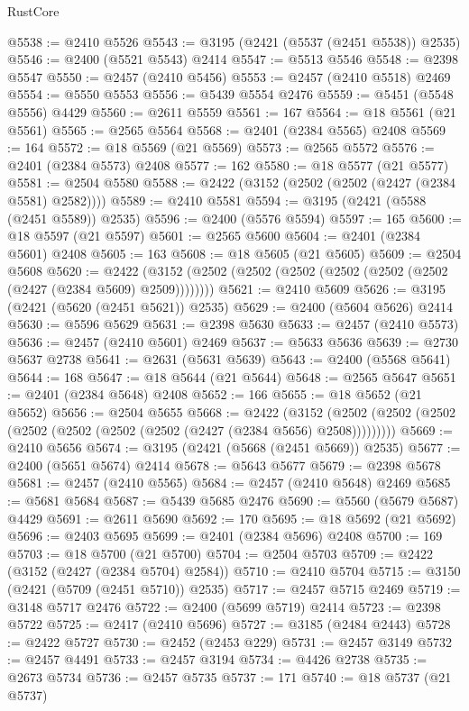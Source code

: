 \begin{lexlean}{RustCore}
\begin{coremodule}
@5538 := @2410 @5526
@5543 := @3195 (@2421 (@5537 (@2451 @5538)) @2535)
@5546 := @2400 (@5521 @5543) @2414
@5547 := @5513 @5546
@5548 := @2398 @5547
@5550 := @2457 (@2410 @5456)
@5553 := @2457 (@2410 @5518) @2469
@5554 := @5550 @5553
@5556 := @5439 @5554 @2476
@5559 := @5451 (@5548 @5556) @4429
@5560 := @2611 @5559
@5561 := 167
@5564 := @18 @5561 (@21 @5561)
@5565 := @2565 @5564
@5568 := @2401 (@2384 @5565) @2408
@5569 := 164
@5572 := @18 @5569 (@21 @5569)
@5573 := @2565 @5572
@5576 := @2401 (@2384 @5573) @2408
@5577 := 162
@5580 := @18 @5577 (@21 @5577)
@5581 := @2504 @5580
@5588 := @2422 (@3152 (@2502 (@2502 (@2427 (@2384 @5581) @2582))))
@5589 := @2410 @5581
@5594 := @3195 (@2421 (@5588 (@2451 @5589)) @2535)
@5596 := @2400 (@5576 @5594)
@5597 := 165
@5600 := @18 @5597 (@21 @5597)
@5601 := @2565 @5600
@5604 := @2401 (@2384 @5601) @2408
@5605 := 163
@5608 := @18 @5605 (@21 @5605)
@5609 := @2504 @5608
@5620 := @2422 (@3152 (@2502 (@2502 (@2502 (@2502 (@2502 (@2502 (@2427 (@2384 @5609) @2509))))))))
@5621 := @2410 @5609
@5626 := @3195 (@2421 (@5620 (@2451 @5621)) @2535)
@5629 := @2400 (@5604 @5626) @2414
@5630 := @5596 @5629
@5631 := @2398 @5630
@5633 := @2457 (@2410 @5573)
@5636 := @2457 (@2410 @5601) @2469
@5637 := @5633 @5636
@5639 := @2730 @5637 @2738
@5641 := @2631 (@5631 @5639)
@5643 := @2400 (@5568 @5641)
@5644 := 168
@5647 := @18 @5644 (@21 @5644)
@5648 := @2565 @5647
@5651 := @2401 (@2384 @5648) @2408
@5652 := 166
@5655 := @18 @5652 (@21 @5652)
@5656 := @2504 @5655
@5668 := @2422
    (@3152 (@2502 (@2502 (@2502 (@2502 (@2502 (@2502 (@2502 (@2427 (@2384 @5656) @2508)))))))))
@5669 := @2410 @5656
@5674 := @3195 (@2421 (@5668 (@2451 @5669)) @2535)
@5677 := @2400 (@5651 @5674) @2414
@5678 := @5643 @5677
@5679 := @2398 @5678
@5681 := @2457 (@2410 @5565)
@5684 := @2457 (@2410 @5648) @2469
@5685 := @5681 @5684
@5687 := @5439 @5685 @2476
@5690 := @5560 (@5679 @5687) @4429
@5691 := @2611 @5690
@5692 := 170
@5695 := @18 @5692 (@21 @5692)
@5696 := @2403 @5695
@5699 := @2401 (@2384 @5696) @2408
@5700 := 169
@5703 := @18 @5700 (@21 @5700)
@5704 := @2504 @5703
@5709 := @2422 (@3152 (@2427 (@2384 @5704) @2584))
@5710 := @2410 @5704
@5715 := @3150 (@2421 (@5709 (@2451 @5710)) @2535)
@5717 := @2457 @5715 @2469
@5719 := @3148 @5717 @2476
@5722 := @2400 (@5699 @5719) @2414
@5723 := @2398 @5722
@5725 := @2417 (@2410 @5696)
@5727 := @3185 (@2484 @2443)
@5728 := @2422 @5727
@5730 := @2452 (@2453 @229)
@5731 := @2457 @3149
@5732 := @2457 @4491
@5733 := @2457 @3194
@5734 := @4426 @2738
@5735 := @2673 @5734
@5736 := @2457 @5735
@5737 := 171
@5740 := @18 @5737 (@21 @5737)

\end{coremodule}
\end{lexlean}
